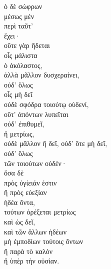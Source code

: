 {\large
\begin{greek}
\noindent  ὁ δὲ σώφρων \\
μέσως μὲν \\
\tabto{2em} περὶ ταῦτ' \\
ἔχει· \\
\tabto{2em} οὔτε γὰρ ἥδεται \\
\tabto{4em} οἷς μάλιστα \\
\tabto{2em} ὁ ἀκόλαστος, \\
\tabto{4em} ἀλλὰ μᾶλλον δυσχεραίνει, \\
\tabto{2em} οὐδ' ὅλως \\
\tabto{4em} οἷς μὴ δεῖ \\
\tabto{2em} οὐδὲ σφόδρα τοιούτῳ οὐδενί, \\
\tabto{4em} οὔτ' ἀπόντων λυπεῖται \\
\tabto{4em} οὐδ' ἐπιθυμεῖ, \\
\tabto{2em} ἢ μετρίως, \\
\tabto{4em} οὐδὲ μᾶλλον ἢ δεῖ,
\tabto{4em} οὐδ' ὅτε μὴ δεῖ, \\
\tabto{4em} οὐδ' ὅλως \\
\tabto{6em} τῶν τοιούτων οὐδέν· \\
ὅσα δὲ \\
\tabto{2em} πρὸς ὑγίειάν ἐστιν \\
\tabto{2em} ἢ πρὸς εὐεξίαν \\
ἡδέα ὄντα, \\
\tabto{2em} τούτων ὀρέξεται μετρίως \\
\tabto{4em} καὶ ὡς δεῖ, \\
\tabto{2em} καὶ τῶν ἄλλων ἡδέων \\
\tabto{4em} μὴ ἐμποδίων τούτοις ὄντων \\
\tabto{6em} ἢ παρὰ τὸ καλὸν \\
\tabto{6em} ἢ ὑπὲρ τὴν οὐσίαν. \\

\end{greek}
}


